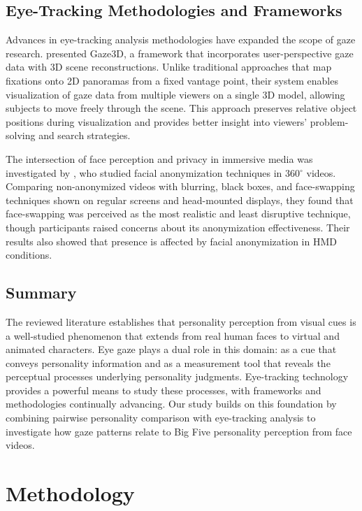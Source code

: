 \documentclass[12pt,a4paper]{article}
\begin{document}
\subsection{Eye-Tracking Methodologies and Frameworks}

Advances in eye-tracking analysis methodologies have expanded the scope of gaze research. \citet{booth2013gaze3d} presented Gaze3D, a framework that incorporates user-perspective gaze data with 3D scene reconstructions. Unlike traditional approaches that map fixations onto 2D panoramas from a fixed vantage point, their system enables visualization of gaze data from multiple viewers on a single 3D model, allowing subjects to move freely through the scene. This approach preserves relative object positions during visualization and provides better insight into viewers' problem-solving and search strategies.

The intersection of face perception and privacy in immersive media was investigated by \citet{wohler2024investigating}, who studied facial anonymization techniques in 360$^\circ$ videos. Comparing non-anonymized videos with blurring, black boxes, and face-swapping techniques shown on regular screens and head-mounted displays, they found that face-swapping was perceived as the most realistic and least disruptive technique, though participants raised concerns about its anonymization effectiveness. Their results also showed that presence is affected by facial anonymization in HMD conditions.

\subsection{Summary}

The reviewed literature establishes that personality perception from visual cues is a well-studied phenomenon that extends from real human faces to virtual and animated characters. Eye gaze plays a dual role in this domain: as a cue that conveys personality information and as a measurement tool that reveals the perceptual processes underlying personality judgments. Eye-tracking technology provides a powerful means to study these processes, with frameworks and methodologies continually advancing. Our study builds on this foundation by combining pairwise personality comparison with eye-tracking analysis to investigate how gaze patterns relate to Big Five personality perception from face videos.

\section{Methodology}
\end{document}
